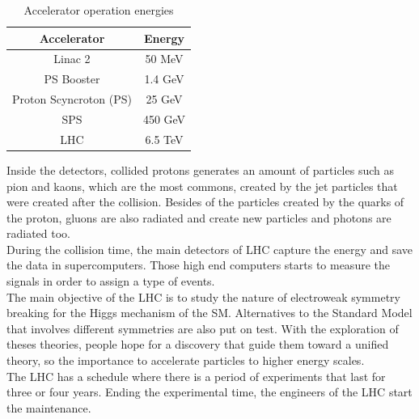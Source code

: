 \begin{table}[!htbp]
\centering
	\caption[Accelerator operation energies]{Accelerator operation energies\cite{cern3,cern1}}
	\begin{tabular}{|c|c|}
		\hline
		Accelerator & Energy \\
		\hline
		Linac 2 & 50 MeV \\
		\hline
		PS Booster & 1.4 GeV \\
		\hline
		Proton Scyncroton (PS) & 25 GeV\\
		\hline
		SPS & 450 GeV\\
		\hline
		LHC & 6.5 TeV\\
		\hline
	\end{tabular}
\end{table}
\pagebreak
Inside the detectors, collided protons generates an amount of particles such as pion and kaons, which are the most commons, created by the jet particles that were created after the collision. Besides of the particles created by the quarks of the proton, gluons are also radiated and create new particles and photons are radiated too. \\
During the collision time, the main detectors of LHC capture the energy 
and save the data in supercomputers. Those high end computers starts to measure the signals in order to assign a type of events.
\\

The main objective of the LHC is to study the nature of electroweak symmetry breaking for the Higgs mechanism of the SM. 
Alternatives to the Standard Model that involves different symmetries are also put on test. With the exploration of theses theories, people hope for a discovery that guide them toward a unified theory, so the importance to accelerate particles to higher energy scales.
\\
The LHC has a schedule where there is a period of experiments that last for three or four years. Ending the experimental time, the engineers of the LHC start the maintenance.

